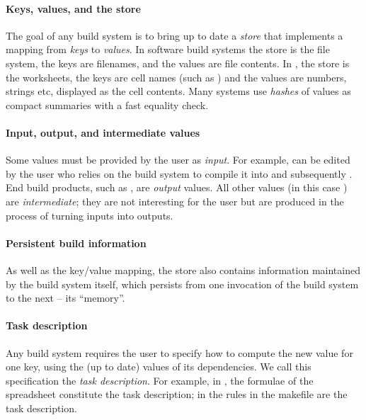\vspace{-2mm}
\paragraph{Keys, values, and the store} The goal of any build system is to
bring up to date a \emph{store} that implements a mapping from \emph{keys} to
\emph{values}. In software build systems the store is the file system, the
keys are filenames, and the values are file contents. In \Excel, the store is
the worksheets, the keys are cell names (such as ) and the values are
numbers, strings etc, displayed as the cell contents. Many systems use
\emph{hashes} of values as compact summaries with a fast equality check.

\vspace{-2mm}
\paragraph{Input, output, and intermediate values}
Some values must be provided by the user as \emph{input}. For example,
 can be edited by the user who relies on the build system to
compile it into  and subsequently . End build products,
such as , are \emph{output} values. All other values (in this case
) are \emph{intermediate}; they are not interesting for the user
but are produced in the process of turning inputs into outputs.

\vspace{-2mm}
\paragraph{Persistent build information} As well as the key/value mapping, the store
also contains information maintained by the build system itself, which persists
from one invocation of the build system to the next -- its ``memory''.

\paragraph{Task description} Any build system requires the user to specify how to
compute the new value for one key, using the (up to date) values of its
dependencies. We call this specification the \emph{task description}.  For
example, in \Excel, the formulae of the spreadsheet constitute the task
description; in \Make the rules in the makefile are the task description.

